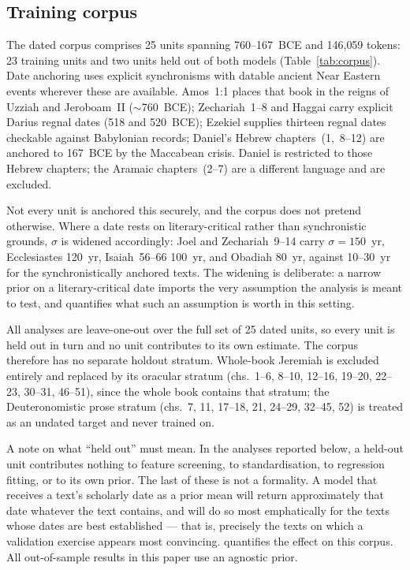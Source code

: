 \documentclass[10pt,letterpaper]{article}
\begin{document}
\subsection*{Training corpus}

The dated corpus comprises 25 units spanning 760--167~BCE and 146{,}059
tokens: 23 training units and two units held out of both models
(Table~\ref{tab:corpus}).  Date anchoring uses explicit synchronisms with
datable ancient Near Eastern events wherever these are available.  Amos~1:1
places that book in the reigns of Uzziah and Jeroboam~II ($\sim$760~BCE);
Zechariah~1--8 and Haggai carry explicit Darius regnal dates (518 and
520~BCE); Ezekiel supplies thirteen regnal dates checkable against
Babylonian records; Daniel's Hebrew chapters~(1,~8--12) are anchored to
167~BCE by the Maccabean crisis.  Daniel is restricted to those Hebrew
chapters; the Aramaic chapters~(2--7) are a different language and are
excluded.

Not every unit is anchored this securely, and the corpus does not pretend
otherwise.  Where a date rests on literary-critical rather than
synchronistic grounds, $\sigma$ is widened accordingly: Joel and
Zechariah~9--14 carry $\sigma = 150$~yr, Ecclesiastes 120~yr, Isaiah~56--66
100~yr, and Obadiah 80~yr, against 10--30~yr for the synchronistically
anchored texts.  The widening is deliberate: a narrow prior on a
literary-critical date imports the very assumption the analysis is meant to
test, and  quantifies what such an assumption is
worth in this setting.

All analyses are leave-one-out over the full set of 25 dated units, so
every unit is held out in turn and no unit contributes to its own estimate.
The corpus therefore has no separate holdout stratum.  Whole-book Jeremiah is
excluded entirely and replaced by its oracular stratum (chs.~1--6, 8--10,
12--16, 19--20, 22--23, 30--31, 46--51), since the whole book contains that
stratum; the Deuteronomistic prose stratum (chs.~7, 11, 17--18, 21, 24--29,
32--45, 52) is treated as an undated target and never trained on.

A note on what ``held out'' must mean.  In the analyses reported below, a
held-out unit contributes nothing to feature screening, to standardisation,
to regression fitting, or to its own prior.  The last of these is not a
formality.  A model that receives a text's scholarly date as a prior mean
will return approximately that date whatever the text contains, and will do
so most emphatically for the texts whose dates are best established --- that
is, precisely the texts on which a validation exercise appears most
convincing.   quantifies the effect on this corpus.
All out-of-sample results in this paper use an agnostic prior.
\end{document}
